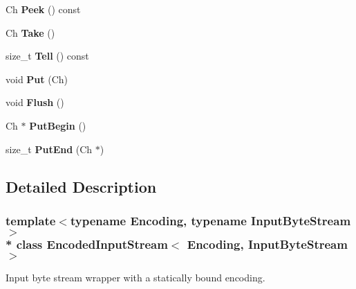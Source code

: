 \begin{DoxyCompactItemize}
\item 
Ch {\bfseries Peek} () const \hypertarget{class_encoded_input_stream_abda3b0c141254343f4c481f67d52b423}{}\label{class_encoded_input_stream_abda3b0c141254343f4c481f67d52b423}

\item 
Ch {\bfseries Take} ()\hypertarget{class_encoded_input_stream_ab42cd57581bf62e42af471583e5b8377}{}\label{class_encoded_input_stream_ab42cd57581bf62e42af471583e5b8377}

\item 
size\+\_\+t {\bfseries Tell} () const \hypertarget{class_encoded_input_stream_a34cdb99fd81cd211f71903348e9c986f}{}\label{class_encoded_input_stream_a34cdb99fd81cd211f71903348e9c986f}

\item 
void {\bfseries Put} (Ch)\hypertarget{class_encoded_input_stream_afea36b666a44bd4adeabfcab7b68a322}{}\label{class_encoded_input_stream_afea36b666a44bd4adeabfcab7b68a322}

\item 
void {\bfseries Flush} ()\hypertarget{class_encoded_input_stream_aa4415bf4b97dd01e8c3de0ad7a161724}{}\label{class_encoded_input_stream_aa4415bf4b97dd01e8c3de0ad7a161724}

\item 
Ch $\ast$ {\bfseries Put\+Begin} ()\hypertarget{class_encoded_input_stream_ad97f7a549a8622c61b7fb2c63fedd69b}{}\label{class_encoded_input_stream_ad97f7a549a8622c61b7fb2c63fedd69b}

\item 
size\+\_\+t {\bfseries Put\+End} (Ch $\ast$)\hypertarget{class_encoded_input_stream_a83fe5ed281413d6005d1b324730e8bed}{}\label{class_encoded_input_stream_a83fe5ed281413d6005d1b324730e8bed}

\end{DoxyCompactItemize}


\subsection{Detailed Description}
\subsubsection*{template$<$typename Encoding, typename Input\+Byte\+Stream$>$\\*
class Encoded\+Input\+Stream$<$ Encoding, Input\+Byte\+Stream $>$}

Input byte stream wrapper with a statically bound encoding. 



